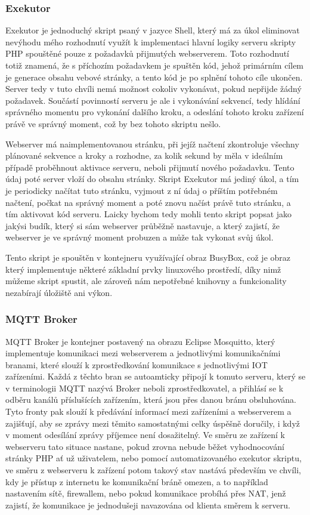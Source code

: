 \subsubsection{Exekutor}

Exekutor je jednoduchý skript psaný v jazyce Shell, který má za úkol eliminovat nevýhodu mého rozhodnutí využít k implementaci hlavní logiky serveru skripty PHP spouštěné pouze z požadavků přijmutých webserverem. Toto rozhodnutí totiž znamená, že s příchozím požadavkem je spuštěn kód, jehož primárním cílem je generace obsahu vebové stránky, a tento kód je po splnění tohoto cíle ukončen. Server tedy v tuto chvíli nemá možnost cokoliv vykonávat, pokud nepřijde žádný požadavek. Součástí povinností serveru je ale i vykonávání sekvencí, tedy hlídání správného momentu pro vykonání dalšího kroku, a odeslání tohoto kroku zařízení právě ve správný moment, což by bez tohoto skriptu nešlo.

Webserver má naimplementovanou stránku, při jejíž načtení zkontroluje všechny plánované sekvence a kroky a rozhodne, za kolik sekund by měla v ideálním případě proběhnout aktivace serveru, neboli přijmutí nového požadavku. Tento údaj poté server vloží do obsahu stránky. Skript Exekutor má jediný úkol, a tím je periodicky načítat tuto stránku, vyjmout z ní údaj o příštím potřebném načtení, počkat na správný moment a poté znovu načíst právě tuto stránku, a tím aktivovat kód serveru. Laicky bychom tedy mohli tento skript popsat jako jakýsi budík, který si sám webserver průběžně nastavuje, a který zajistí, že webserver je ve správný moment probuzen a může tak vykonat svůj úkol.

Tento skript je spouštěn v kontejneru využívající obraz BusyBox, což je obraz který implementuje některé základní prvky linuxového prostředí, díky nimž můžeme skript spustit, ale zároveň nám nepotřebné knihovny a funkcionality nezabírají úložiště ani výkon.

\subsubsection{MQTT Broker}

MQTT Broker je kontejner postavený na obrazu Eclipse Mosquitto, který implementuje komunikaci mezi webserverem a jednotlivými komunikačními branami, které slouží k zprostředkování komunikace s jednotlivými IOT zařízeními. Každá z těchto bran se autoamticky připojí k tomuto serveru, který se v terminologii MQTT nazývá Broker neboli zprostředkovatel, a přihlásí se k odběru kanálů příslušících zařízením, která jsou přes danou bránu obsluhována. Tyto fronty pak slouží k předávání informací mezi zařízeními a webserverem a zajišťují, aby se zprávy mezi těmito samostatnými celky úspěšně doručily, i když v moment odesílání zprávy příjemce není dosažitelný. Ve směru ze zařízení k webserveru tato situace nastane, pokud zrovna nebude běžet vyhodnocování stránky PHP ať už uživatelem, nebo pomocí automatizovaného exekutor skriptu, ve směru z webserveru k zařízení potom takový stav nastává především ve chvíli, kdy je přístup z internetu ke komunikační bráně omezen, a to například nastavením sítě, firewallem, nebo pokud komunikace probíhá přes NAT, jenž zajistí, že komunikace je jednodušeji navazována od klienta směrem k serveru.


